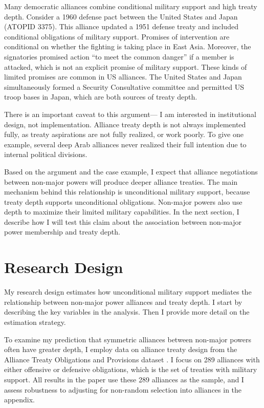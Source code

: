 \documentclass[12pt]{article}
\begin{document}
Many democratic alliances combine conditional military support and high treaty depth. 
Consider a 1960 defense pact between the United States and Japan (ATOPID 3375).
This alliance updated a 1951 defense treaty and included conditional obligations of military support. 
Promises of intervention are conditional on whether the fighting is taking place in East Asia. 
Moreover, the signatories promised action ``to meet the common danger'' if a member is attacked, which is not an explicit promise of military support. 
These kinds of limited promises are common in US alliances. 
The United States and Japan simultaneously formed a Security Consultative committee and permitted US troop bases in Japan, which are both sources of treaty depth. 


There is an important caveat to this argument--- I am interested in institutional design, not implementation.
Alliance treaty depth is not always implemented fully, as treaty aspirations are not fully realized, or work poorly. 
To give one example, several deep Arab alliances never realized their full intention due to internal political divisions.  


Based on the argument and the case example, I expect that alliance negotiations between non-major powers will produce deeper alliance treaties. 
The main mechanism behind this relationship is unconditional military support, because treaty depth supports unconditional obligations. 
Non-major powers also use depth to maximize their limited military capabilities. 
In the next section, I describe how I will test this claim about the association between non-major power membership and treaty depth. 




\section{Research Design}

My research design estimates how unconditional military support mediates the relationship between non-major power alliances and treaty depth. 
I start by describing the key variables in the analysis. 
Then I provide more detail on the estimation strategy. 


To examine my prediction that symmetric alliances between non-major powers often have greater depth, I employ data on alliance treaty design from the Alliance Treaty Obligations and Provisions dataset \citep{Leedsetal2002}. 
I focus on 289 alliances with either offensive or defensive obligations, which is the set of treaties with military support. 
All results in the paper use these 289 alliances as the sample, and I assess robustness to adjusting for non-random selection into alliances in the appendix. 
\end{document}
